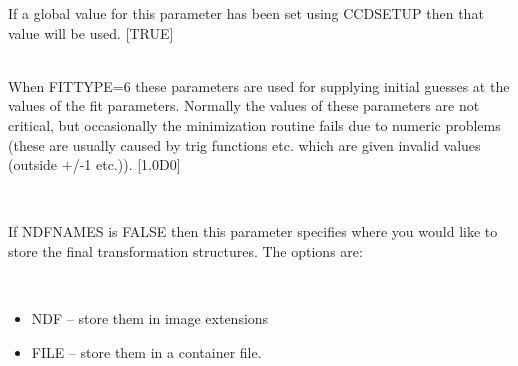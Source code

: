 \documentclass[twoside,11pt]{article}
\newcommand{\htmlref}[2]{#1}
\renewcommand{\_}{\texttt{\symbol{95}}}
\newcommand{\xroutine}[1]{\htmlref{{\sc #1}}{#1}}
\newcommand{\sstsubsection}[1]{ \item[{#1}] \mbox{} \\}
\newcommand{\sstitemlist}[1]{
  \mbox{} \\
  \vspace{-3.5ex}
  \begin{itemize}
     #1
  \end{itemize}
}
\newcommand{\sstitem}{\item}
\newcommand{\sstsubsection}[1]{\item[{#1}]}
\newcommand{\sstitemlist}[1]{
      \begin{itemize}
         #1
      \end{itemize}
      \\
   }
\newcommand{\sstitem}{\item}
\begin{document}
{{{         If a global value for this parameter has been set using
         \xroutine{CCDSETUP} then that value will be used.
         [TRUE]
      }
      \sstsubsection{
         PA-PZ = LITERAL (Read)
      } {
         When FITTYPE=6 these parameters are used for supplying initial
         guesses at the values of the fit parameters. Normally the
         values of these parameters are not critical, but occasionally
         the minimization routine fails due to numeric problems (these
         are usually caused by trig functions etc. which are given
         invalid values (outside $+$/-1 etc.)).
         [1.0D0]
      }
      \sstsubsection{
         PLACEIN = LITERAL (Read)
      } {
         If NDFNAMES is FALSE then this parameter specifies where
         you would like to store the final transformation structures.
         The options are:
         \sstitemlist{

            \sstitem
               NDF  -- store them in image extensions

            \sstitem
               FILE -- store them in a container file.

}}}}
\end{document}
